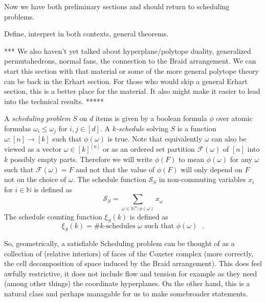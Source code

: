 \documentclass[12pt]{amsart}
\newcommand{\NN}{\mathbb{N}}
\newcommand{\SSS}{\mathcal{S}}
\newcommand{\FFF}{\mathcal{F}}
\newcommand{\defn}[1]{\emph{#1}}
\begin{document}
Now we have both preliminary sections and should return to scheduling problems.

Define, interpret in both contexts, general theorems.  

*** We also haven't yet talked about hyperplane/polytope duality, generalized permutahedrons, normal fans, the connection to the Braid arrangement.  We can start this section with that material or some of the more general polytope theory can be back in the Erhart section.  For those who would skip a general Erhart section, this is a better place for the material.  It also might make it easier to lead into the technical results.  *****




A \defn{scheduling problem} $S$ on $d$ items is given by a boolean formula $\phi$ over atomic formulas $\omega_i\leq \omega_j$ for $i,j\in[d]$.
 A \defn{$k$-schedule} solving $S$ is a function $\omega:[n]\rightarrow[k]$ such that $\phi(\omega)$ is true. Note that equivalently $\omega$ can also be viewed as a vector $\omega\in [k]^{[n]}$ or as an ordered set partition $\FFF(\omega)$ of $[n]$ into $k$ possibly empty parts. Therefore we will write $\phi(F)$ to mean $\phi(\omega)$ for any $\omega$ such that $\FFF(\omega)=F$ and not that the value of $\phi(F)$ will only depend on $F$ not on the choice of $\omega$. The schedule function $\SSS_S$ in non-commuting variables $x_i$ for $i\in \NN$ is defined as
\[
  \SSS_S = \sum_{\omega\in \NN^n: \phi(\omega) } x_\omega
\] 
The schedule counting function $\xi_S(k)$ is defined as
\[
  \xi_S(k) = \# \text{$k$-schedules $\omega$ such that $\phi(\omega)$ }.
\]


So, geometrically, a satisfiable Scheduling problem can be thought of
as a collection of (relative interiors) of faces of the Coxeter
complex (more correctly, the cell decomposition of space induced by
the Braid arrangement).  This does feel awfully restrictive, it does
not include flow and tension for example as they need (among other
things) the coordinate hyperplanes.  On the other hand, this is a
natural class and perhaps managable for us to make somebroader
statements.
\end{document}
